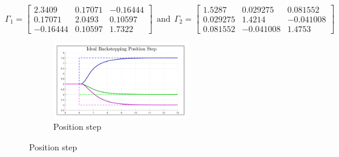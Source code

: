 \begin{equation}\label{eq:optimized-Position-IBC}
\Gamma_1 = \begin{bmatrix}
2.3409 & 0.17071 & -0.16444\\
0.17071 & 2.0493 & 0.10597\\
-0.16444 & 0.10597 & 1.7322
\end{bmatrix}
~~\text{and}~~\Gamma_2= \begin{bmatrix}
1.5287 & 0.029275 & 0.081552\\
0.029275 & 1.4214 & -0.041008\\
0.081552 & -0.041008 & 1.4753
\end{bmatrix}
\end{equation}
\par
\begin{figure}[hbtp]
\vspace{-15pt}
\centering
\begin{subfigure}{\textwidth}
\centering
\includegraphics[width=0.65\textwidth]{graphs/IBC_Position_Step}
\caption{Position step}
\label{fig:IBC_Position_Step}
\end{subfigure}
\end{figure}
\newpage
